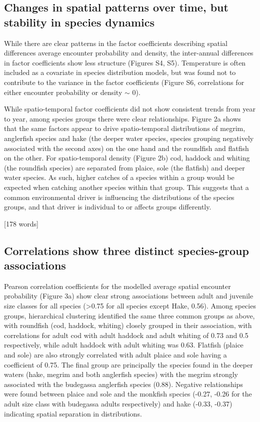\documentclass{nature}
\begin{document}
\begin{linenumbers}
[397 words]

\subsection{Changes in spatial patterns over time, but stability in species
	dynamics}

While there are clear patterns in the factor coefficients describing spatial
differences average encounter probability and density, the inter-annual
differences in factor coefficients show less structure (Figures S4, S5).
Temperature is often included as a covariate in species distribution models,
but was found not to contribute to the variance in the factor coefficients
(Figure S6, correlations for either encounter probability or density $\sim$ 0).

While spatio-temporal factor coefficients did not show consistent trends from
year to year, among species groups there were clear relationships. Figure 2a
shows that the same factors appear to drive spatio-temporal distributions of
megrim, anglerfish species and hake (the deeper water species, species grouping
negatively associated with the second axes) on the one hand and the roundfish
and flatfish on the other. For spatio-temporal density (Figure 2b) cod, haddock
and whiting (the roundfish species) are separated from plaice, sole (the
flatfish) and deeper water species. As such, higher catches of a species within
a group would be expected when catching another species within that group. This
suggests that a common environmental driver is influencing the distributions of
the species groups, and that driver is individual to or affects groups
differently.  

[178 words]

\subsection{Correlations show three distinct species-group associations}
Pearson correlation coefficients for the modelled average spatial encounter
probability (Figure 3a) show clear strong associations between adult and
juvenile size classes for all species (\textgreater 0.75 for all species except
Hake, 0.56).  Among species groups, hierarchical clustering identified the same
three common groups as above, with roundfish (cod, haddock, whiting) closely
grouped in their association, with correlations for adult cod with adult
haddock and adult whiting of 0.73 and 0.5 respectively, while adult haddock
with adult whiting was 0.63. Flatfish (plaice and sole) are also strongly
correlated with adult plaice and sole having a coefficient of 0.75.  The final
group are principally the species found in the deeper waters (hake, megrim and
both anglerfish species) with the megrim strongly associated with the budegassa
anglerfish species (0.88). Negative relationships were found between plaice and
sole and the monkfish species (-0.27, -0.26 for the adult size class with
budegassa adults respectively) and hake (-0.33, -0.37) indicating spatial
separation in distributions.


\end{linenumbers}
\end{document}
